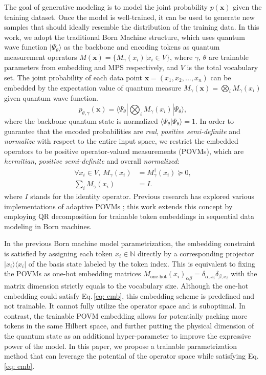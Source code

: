 \documentclass[aps,prb,twocolumn,superscriptaddress]{revtex4-2}
\newcommand{\bra}[1]{\langle #1|}
\newcommand{\ket}[1]{|#1 \rangle}
\newcommand{\braket}[2]{\langle #1|#2 \rangle}
\newcommand{\dsN}{\mathbb{N}}
\newcommand{\vect}[1]{{\bm{#1}}}
\newcommand{\eqnref}[1]{Eq.\,\eqref{#1}}
\begin{document}
The goal of generative modeling is to model the joint probability $p(\vect{x})$ given the training dataset. Once the model is well-trained, it can be used to generate new samples that should ideally resemble the distribution of the training data. In this work, we adopt the traditional Born Machine structure, which uses quantum wave function $\ket{\Psi_\theta}$ as the backbone and encoding tokens as quantum measurement operators $M(\vect{x})=\{M_{\gamma}(x_i)|x_i\in V\}$, where $\gamma$, $\theta$ are trainable parameters from embedding and MPS respectively, and $V$ is the total vocabulary set. The joint probability of each data point $\vect{x}=(x_1,x_2,...,x_n)$ can be embedded by the expectation value of quantum measure $M_\gamma(\vect{x})=\bigotimes_{i}M_{\gamma}(x_i)$ given quantum wave function.
\begin{equation}\label{eq: P}
    p_{\theta, \gamma}(\vect{x})=\bra{\Psi_\theta}\bigotimes_{i}M_{\gamma}(x_i)\ket{\Psi_\theta},
\end{equation}
where the backbone quantum state is normalized $\braket{\Psi_\theta}{\Psi_\theta}=1$. In order to guarantee that the encoded probabilities are \textit{real}, \textit{positive semi-definite} and \textit{normalize} with respect to the entire input space, we restrict the embedded operators to be positive operator-valued measurements (POVMs), which are \textit{hermitian}, \textit{positive semi-definite} and overall \textit{normalized}:
\begin{equation}\label{eq: emb}
\begin{split}
    \forall x_{i}\in V,\ M_{\gamma}(x_i)&=M^{\dagger}_{\gamma}(x_i)\succeq 0,\\
    \sum_{i}M_{\gamma}(x_i)&=I.
\end{split}
\end{equation}
where $I$ stands for the identity operator. Previous research has explored various implementations of adaptive POVMs \cite{2022arXiv220807817G, 2023arXiv230315353Z, 2021PRXQ....2d0342G}; this work extends this concept by employing QR decomposition for trainable token embeddings in sequential data modeling in Born machines.


In the previous Born machine model parametrization, the embedding constraint is satisfied by assigning each token $x_i\in\dsN$ directly by a corresponding projector $\ket{x_i}\bra{x_i}$ of the basis state\cite{PhysRevX.8.031012} labeled by the token index. This is equivalent to fixing the POVMs as one-hot embedding matrices $M_\text{one-hot}(x_i)_{\alpha\beta}=\delta_{\alpha,x_i}\delta_{\beta,x_i}$ with the matrix dimension strictly equals to the vocabulary size. Although the one-hot embedding could satisfy \eqnref{eq: emb}, this embedding scheme is predefined and not trainable. It cannot fully utilize the operator space and is suboptimal. In contrast, the trainable POVM embedding allows for potentially packing more tokens in the same Hilbert space, and further putting the physical dimension of the quantum state as an additional hyper-parameter to improve the expressive power of the model. In this paper, we propose a trainable parametrization method that can leverage the potential of the operator space while satisfying \eqnref{eq: emb}.
\end{document}
